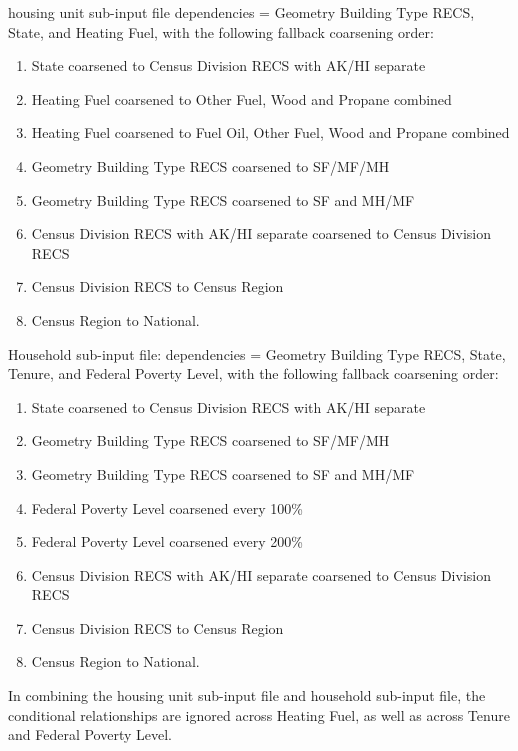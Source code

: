 housing unit sub-input file  dependencies = Geometry Building Type RECS, State, and Heating Fuel, with the following fallback coarsening order:
\begin{enumerate}
    \item State coarsened to Census Division RECS with AK/HI separate 
    \item  Heating Fuel coarsened to Other Fuel, Wood and Propane combined
    \item Heating Fuel coarsened to Fuel Oil, Other Fuel, Wood and Propane combined
    \item Geometry Building Type RECS coarsened to SF/MF/MH
    \item  Geometry Building Type RECS coarsened to SF and MH/MF 
    \item  Census Division RECS with AK/HI separate coarsened to Census Division RECS 
    \item Census Division RECS to Census Region 
    \item Census Region to National.  
\end{enumerate}
Household sub-input file: dependencies = Geometry Building Type RECS, State, Tenure, and Federal Poverty Level, with the following fallback coarsening order:
\begin{enumerate}
    \item State coarsened to Census Division RECS with AK/HI separate 
    \item  Geometry Building Type RECS coarsened to SF/MF/MH 
    \item  Geometry Building Type RECS coarsened to SF and MH/MF 
    \item  Federal Poverty Level coarsened every 100\% 
    \item Federal Poverty Level coarsened every 200\% 
    \item Census Division RECS with AK/HI separate coarsened to Census Division RECS 
    \item Census Division RECS to Census Region 
    \item Census Region to National. 
\end{enumerate}
In combining the housing unit sub-input file and household sub-input file, the conditional relationships are ignored across Heating Fuel, as well as across Tenure and Federal Poverty Level.

